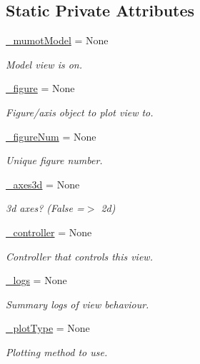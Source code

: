 \subsection*{Static Private Attributes}
\begin{DoxyCompactItemize}
\item 
\hyperlink{class_mu_mo_t_1_1_mu_mo_tview_aeacd9541246371f0db5cc3e3779762fa}{\+\_\+mumot\+Model} = None
\begin{DoxyCompactList}\small\item\em Model view is on. \end{DoxyCompactList}\item 
\hyperlink{class_mu_mo_t_1_1_mu_mo_tview_abf6d9f6be3898e307415d4598cde264d}{\+\_\+figure} = None
\begin{DoxyCompactList}\small\item\em Figure/axis object to plot view to. \end{DoxyCompactList}\item 
\hyperlink{class_mu_mo_t_1_1_mu_mo_tview_a5748371a5f2e09033908d21bb12f94c0}{\+\_\+figure\+Num} = None
\begin{DoxyCompactList}\small\item\em Unique figure number. \end{DoxyCompactList}\item 
\hyperlink{class_mu_mo_t_1_1_mu_mo_tview_a506ccaeadc9c6f4102cf4e06f5a6be2a}{\+\_\+axes3d} = None
\begin{DoxyCompactList}\small\item\em 3d axes? (False =$>$ 2d) \end{DoxyCompactList}\item 
\hyperlink{class_mu_mo_t_1_1_mu_mo_tview_a15f56ca9811d1e67d721fa64f9b0dc1e}{\+\_\+controller} = None
\begin{DoxyCompactList}\small\item\em Controller that controls this view. \end{DoxyCompactList}\item 
\hyperlink{class_mu_mo_t_1_1_mu_mo_tview_ac0ad5d0ca27f2668c0676334ee73ff52}{\+\_\+logs} = None
\begin{DoxyCompactList}\small\item\em Summary logs of view behaviour. \end{DoxyCompactList}\item 
\hyperlink{class_mu_mo_t_1_1_mu_mo_tview_a5feff4ca83ee97d6e09874496a4975d4}{\+\_\+plot\+Type} = None
\begin{DoxyCompactList}\small\item\em Plotting method to use. \end{DoxyCompactList}\item 

\end{DoxyCompactItemize}
